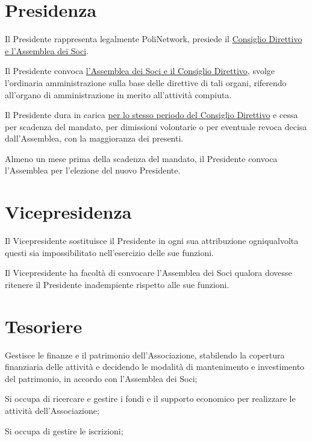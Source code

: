 \documentclass[legalpaper, 11pt]{exam}
\let\tempone\enumerate
\let\temptwo\endenumerate
\renewenvironment{enumerate}{\tempone\addtolength{\itemsep}{-0.45\baselineskip}}{\temptwo}
\begin{document}
\section{Presidenza}
\begin{enumerate}
 \item Il Presidente rappresenta legalmente PoliNetwork, presiede il \underline{Consiglio Direttivo e l'Assemblea dei Soci}.
 \item Il Presidente convoca \underline{l'Assemblea dei Soci e il Consiglio Direttivo}, svolge l'ordinaria amministrazione sulla base delle direttive di tali organi, riferendo all'organo di amministrazione in merito all'attività compiuta.
 \item Il Presidente dura in carica \underline{per lo stesso periodo del Consiglio Direttivo} e cessa per scadenza del mandato, per dimissioni volontarie o per eventuale revoca decisa dall'Assemblea, con la maggioranza dei presenti.
 \item Almeno un mese prima della scadenza del mandato, il Presidente convoca l'Assemblea per l'elezione del nuovo Presidente.
\end{enumerate}

\section{Vicepresidenza}
\begin{enumerate}
 \item Il Vicepresidente sostituisce il Presidente in ogni sua attribuzione ogniqualvolta questi sia impossibilitato nell'esercizio delle sue funzioni.
 \item Il Vicepresidente ha facoltà di convocare l’Assemblea dei Soci qualora dovesse ritenere il Presidente inadempiente rispetto alle sue funzioni.
\end{enumerate}

\section{Tesoriere}
\begin{enumerate}
	\item Gestisce le finanze e il patrimonio dell’Associazione, stabilendo la copertura finanziaria delle attività e decidendo le modalità di mantenimento e investimento del patrimonio, in accordo con l’Assemblea dei Soci;
	\item Si occupa di ricercare e gestire i fondi e il supporto economico per realizzare le attività dell’Associazione;
	\item Si occupa di gestire le iscrizioni;
\end{enumerate}
\end{document}
